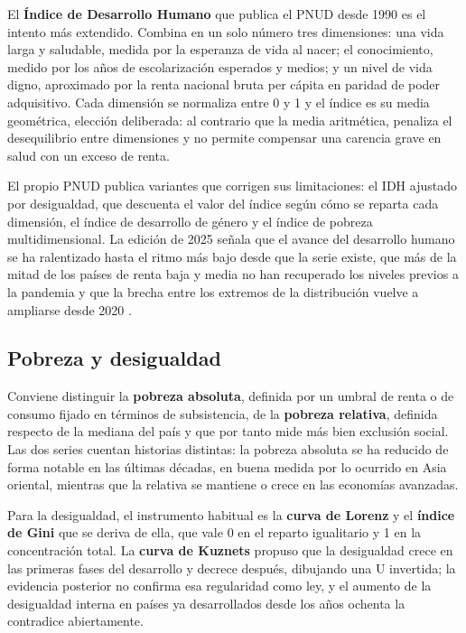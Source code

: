 El \textbf{Índice de Desarrollo Humano} que publica el PNUD desde 1990 es el
intento más extendido. Combina en un solo número tres dimensiones: una vida
larga y saludable, medida por la esperanza de vida al nacer; el conocimiento,
medido por los años de escolarización esperados y medios; y un nivel de vida
digno, aproximado por la renta nacional bruta per cápita en paridad de poder
adquisitivo. Cada dimensión se normaliza entre 0 y 1 y el índice es su media
geométrica, elección deliberada: al contrario que la media aritmética, penaliza
el desequilibrio entre dimensiones y no permite compensar una carencia grave en
salud con un exceso de renta.

El propio PNUD publica variantes que corrigen sus limitaciones: el IDH ajustado
por desigualdad, que descuenta el valor del índice según cómo se reparta cada
dimensión, el índice de desarrollo de género y el índice de pobreza
multidimensional. La edición de 2025 señala que el avance del desarrollo humano
se ha ralentizado hasta el ritmo más bajo desde que la serie existe, que más de
la mitad de los países de renta baja y media no han recuperado los niveles
previos a la pandemia y que la brecha entre los extremos de la distribución
vuelve a ampliarse desde 2020 \parencite{pnud2025}.

\subsection{Pobreza y desigualdad}

Conviene distinguir la \textbf{pobreza absoluta}, definida por un umbral de
renta o de consumo fijado en términos de subsistencia, de la \textbf{pobreza
relativa}, definida respecto de la mediana del país y que por tanto mide más
bien exclusión social. Las dos series cuentan historias distintas: la pobreza
absoluta se ha reducido de forma notable en las últimas décadas, en buena medida
por lo ocurrido en Asia oriental, mientras que la relativa se mantiene o crece
en las economías avanzadas.

Para la desigualdad, el instrumento habitual es la \textbf{curva de Lorenz} y el
\textbf{índice de Gini} que se deriva de ella, que vale 0 en el reparto
igualitario y 1 en la concentración total. La \textbf{curva de Kuznets} propuso
que la desigualdad crece en las primeras fases del desarrollo y decrece después,
dibujando una U invertida; la evidencia posterior no confirma esa regularidad
como ley, y el aumento de la desigualdad interna en países ya desarrollados
desde los años ochenta la contradice abiertamente.

